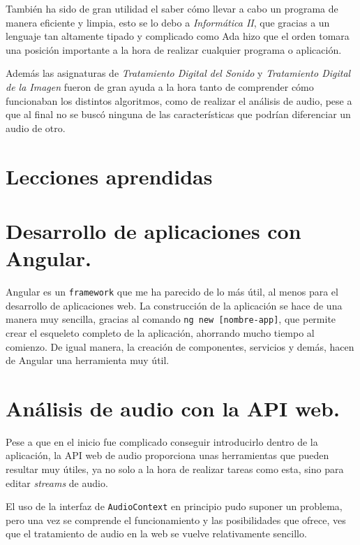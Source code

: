\documentclass[a4paper, 12pt]{book}
\begin{document}
También ha sido de gran utilidad el saber cómo llevar a cabo un programa de manera eficiente y limpia, esto se lo debo a \textit{Informática II}, que gracias a un lenguaje tan altamente tipado y complicado como Ada hizo que el orden tomara una posición importante a la hora de realizar cualquier programa o aplicación.

Además las asignaturas de \textit{Tratamiento Digital del Sonido} y \textit{Tratamiento Digital de la Imagen} fueron de gran ayuda a la hora tanto de comprender cómo funcionaban los distintos algoritmos, como de realizar el análisis de audio, pese a que al final no se buscó ninguna de las características que podrían diferenciar un audio de otro.


\section{Lecciones aprendidas}
\label{sec:lecciones_aprendidas}

\section*{Desarrollo de aplicaciones con Angular.}

Angular es un \texttt{framework} que me ha parecido de lo más útil, al menos para el desarrollo de aplicaciones web. La construcción de la aplicación se hace de una manera muy sencilla, gracias al comando \texttt{ng new [nombre-app]}, que permite crear el esqueleto completo de la aplicación, ahorrando mucho tiempo al comienzo. De igual manera, la creación de componentes, servicios y demás, hacen de Angular una herramienta muy útil.

\section*{Análisis de audio con la API web.}

Pese a que en el inicio fue complicado conseguir introducirlo dentro de la aplicación, la API web de audio proporciona unas herramientas que pueden resultar muy útiles, ya no solo a la hora de realizar tareas como esta, sino para editar \textit{streams} de audio.

El uso de la interfaz de \texttt{AudioContext} en principio pudo suponer un problema, pero una vez se comprende el funcionamiento y las posibilidades que ofrece, ves que el tratamiento de audio en la web se vuelve relativamente sencillo.
\end{document}

